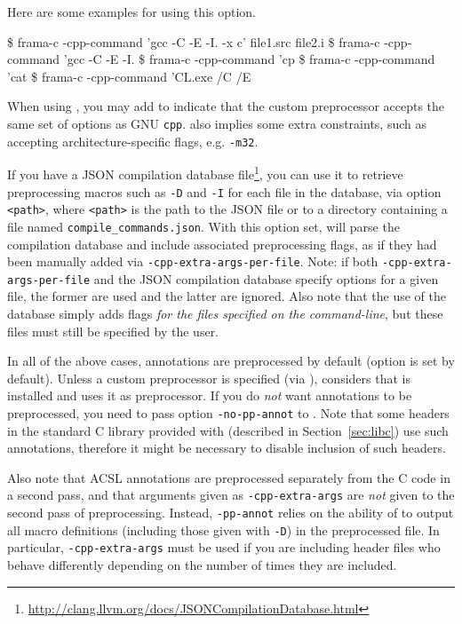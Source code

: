Here are some examples for using this option.
\begin{shell}
\$ frama-c -cpp-command 'gcc -C -E -I. -x c' file1.src file2.i
\$ frama-c -cpp-command 'gcc -C -E -I. %
\$ frama-c -cpp-command 'cp %
\$ frama-c -cpp-command 'cat %
\$ frama-c -cpp-command 'CL.exe /C /E %
\end{shell}

When using , you may add 
to indicate that the custom preprocessor accepts the same set of options as GNU
\texttt{cpp}.
 also implies some extra
constraints, such as accepting architecture-specific flags, e.g. \texttt{-m32}.

If you have a JSON compilation database file\footnote{%
  \url{http://clang.llvm.org/docs/JSONCompilationDatabase.html}}, you can use
it to retrieve preprocessing macros such as \texttt{-D} and \texttt{-I}
for each file in the database, via option
 \texttt{<path>}, where \texttt{<path>}
is the path to the JSON file or to a directory containing a
file named \texttt{compile\_commands.json}. With this option set,
\FramaC will parse
the compilation database and include associated preprocessing flags,
as if they had been manually added via \texttt{-cpp-extra-args-per-file}.
Note: if both \texttt{-cpp-extra-args-per-file} and the JSON compilation
database specify options for a given file, the former are used and the latter
are ignored. Also note that the use of the database simply adds flags
{\em for the files specified on the command-line}, but these files must still
be specified by the user.

In all of the above cases,
\acsl annotations are preprocessed by default (option 
is set by default). Unless a custom preprocessor is specified
(via ), \FramaC considers that \gcc is
installed and uses it as preprocessor.
If you do \emph{not} want annotations to be preprocessed, you need to pass
option \texttt{-no-pp-annot} to \FramaC. Note that some headers in the
standard C library provided with \FramaC (described in Section~\ref{sec:libc})
use such annotations,
therefore it might be necessary to disable inclusion of such headers.

Also note that ACSL annotations are preprocessed separately from the C
code in a second pass, and that arguments given as \texttt{-cpp-extra-args} are
\emph{not} given to the second pass of preprocessing. Instead,
\texttt{-pp-annot} relies on the ability of \gcc to output all
macro definitions (including those given with \texttt{-D}) in the
preprocessed file. In particular, \texttt{-cpp-extra-args} must be
used if you are including header files who behave differently
depending on the number of times they are included.

